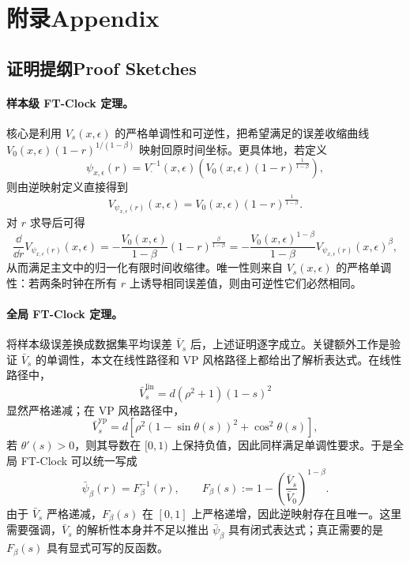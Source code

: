 \section{\ifinternalcn 附录\else Appendix\fi}

\ifinternalcn
\subsection{\ifinternalcn 证明提纲\else Proof Sketches\fi}

\paragraph{样本级 FT-Clock 定理。}
核心是利用 $V_s(x,\epsilon)$ 的严格单调性和可逆性，把希望满足的误差收缩曲线
\(
  V_0(x,\epsilon)(1-r)^{1/(1-\beta)}
\)
映射回原时间坐标。更具体地，若定义
\begin{equation}
  \psi_{x,\epsilon}(r)
  =
  V_{\cdot}^{-1}(x,\epsilon)
  \left(
    V_0(x,\epsilon)(1-r)^{\frac{1}{1-\beta}}
  \right),
\end{equation}
则由逆映射定义直接得到
\begin{equation}
  V_{\psi_{x,\epsilon}(r)}(x,\epsilon)
  =
  V_0(x,\epsilon)(1-r)^{\frac{1}{1-\beta}}.
\end{equation}
对 $r$ 求导后可得
\begin{equation}
  \frac{\dd}{\dd r}V_{\psi_{x,\epsilon}(r)}(x,\epsilon)
  =
  -\frac{V_0(x,\epsilon)}{1-\beta}(1-r)^{\frac{\beta}{1-\beta}}
  =
  -\frac{V_0(x,\epsilon)^{1-\beta}}{1-\beta}
  V_{\psi_{x,\epsilon}(r)}(x,\epsilon)^\beta,
\end{equation}
从而满足主文中的归一化有限时间收缩律。唯一性则来自 $V_s(x,\epsilon)$ 的严格单调性：若两条时钟在所有 $r$ 上诱导相同误差值，则由可逆性它们必然相同。

\paragraph{全局 FT-Clock 定理。}
将样本级误差换成数据集平均误差 $\bar{V}_s$ 后，上述证明逐字成立。关键额外工作是验证 $\bar{V}_s$ 的单调性，本文在线性路径和 VP 风格路径上都给出了解析表达式。在线性路径中，
\begin{equation}
  \bar{V}^{\mathrm{lin}}_s = d(\rho^2+1)(1-s)^2
\end{equation}
显然严格递减；在 VP 风格路径中，
\begin{equation}
  \bar{V}^{\mathrm{vp}}_s
  =
  d\left[\rho^2(1-\sin\theta(s))^2+\cos^2\theta(s)\right],
\end{equation}
若 $\theta'(s)>0$，则其导数在 $[0,1)$ 上保持负值，因此同样满足单调性要求。于是全局 FT-Clock 可以统一写成
\begin{equation}
  \bar{\psi}_{\beta}(r)
  =
  F_{\beta}^{-1}(r),
  \qquad
  F_{\beta}(s)
  :=
  1-\left(\frac{\bar{V}_s}{\bar{V}_0}\right)^{1-\beta}.
\end{equation}
由于 $\bar{V}_s$ 严格递减，$F_{\beta}(s)$ 在 $[0,1]$ 上严格递增，因此逆映射存在且唯一。这里需要强调，$\bar{V}_s$ 的解析性本身并不足以推出 $\bar{\psi}_{\beta}$ 具有闭式表达式；真正需要的是 $F_{\beta}(s)$ 具有显式可写的反函数。

